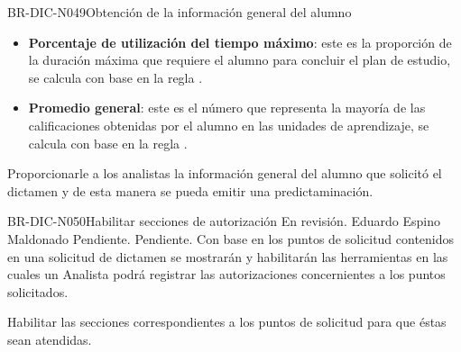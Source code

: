 \begin{BusinessRule}{BR-DIC-N049}{Obtención de la información general del alumno}
\begin{itemize}
		\item \textbf{Porcentaje de utilización del tiempo máximo}: este es la proporción de la duración máxima que requiere el alumno para concluir el plan de estudio, se calcula con base en la regla .
		\item \textbf{Promedio general}: este es el número que representa la mayoría de las calificaciones obtenidas por el alumno en las unidades de aprendizaje, se calcula con base en la regla .
	\end{itemize} 

	\BRItem[Motivación] Proporcionarle a los analistas la información general del alumno que solicitó el dictamen y de esta manera se pueda emitir una predictaminación.
\end{BusinessRule}

\begin{BusinessRule}{BR-DIC-N050}{Habilitar secciones de autorización}
	{\bcCondition} %
	{\btEnabler}     %
	{\blControlling}     %
	\BRItem[Estado] En revisión.
	  Eduardo Espino Maldonado
	 Pendiente.
	 Pendiente.
	\BRItem[Descripción] Con base en los puntos de solicitud contenidos en una solicitud de dictamen se mostrarán y habilitarán las herramientas en las cuales un Analista podrá registrar las autorizaciones concernientes a los puntos solicitados.
	\BRItem[Sentencia] \cdtEmpty
	
	\BRItem[Motivación] Habilitar las secciones correspondientes a los puntos de solicitud para que éstas sean atendidas.
\end{BusinessRule}

